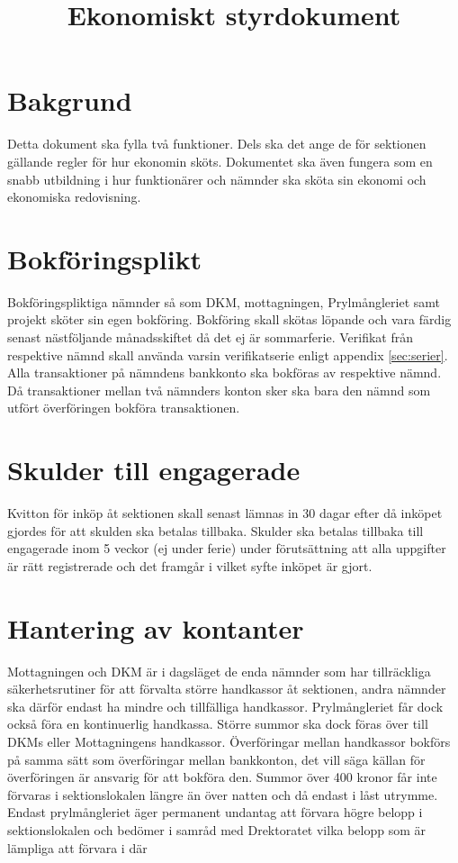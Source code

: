 \documentclass{dgovdoc}
\title{Ekonomiskt styrdokument}
\begin{document}
\maketitle

\section{Bakgrund}

Detta dokument ska fylla två funktioner. Dels ska det ange de för sektionen gällande regler för hur ekonomin
sköts. Dokumentet ska även fungera som en snabb utbildning i hur funktionärer och nämnder ska sköta sin
ekonomi och ekonomiska redovisning.

\section{Bokföringsplikt}

Bokföringspliktiga nämnder så som DKM, mottagningen, Prylmångleriet samt projekt sköter sin egen
bokföring. Bokföring skall skötas löpande och vara färdig senast nästföljande månadsskiftet då det ej är
sommarferie. Verifikat från respektive nämnd skall använda varsin verifikatserie enligt appendix \ref{sec:serier}. Alla
transaktioner på nämndens bankkonto ska bokföras av respektive nämnd. Då transaktioner mellan två
nämnders konton sker ska bara den nämnd som utfört överföringen bokföra transaktionen.

\section{Skulder till engagerade}

Kvitton för inköp åt sektionen skall senast lämnas in 30 dagar efter då inköpet gjordes för att skulden ska
betalas tillbaka. Skulder ska betalas tillbaka till engagerade inom 5 veckor (ej under ferie) under
förutsättning att alla uppgifter är rätt registrerade och det framgår i vilket syfte inköpet är gjort.

\section{Hantering av kontanter}
\label{sec:kontanter}
Mottagningen och DKM är i dagsläget de enda nämnder som har tillräckliga säkerhetsrutiner för att förvalta
större handkassor åt sektionen, andra nämnder ska därför endast ha mindre och tillfälliga handkassor.
Prylmångleriet får dock också föra en kontinuerlig handkassa. Större summor ska dock föras över till DKMs
eller Mottagningens handkassor. Överföringar mellan handkassor bokförs på samma sätt som överföringar
mellan bankkonton, det vill säga källan för överföringen är ansvarig för att bokföra den. Summor över 400
kronor får inte förvaras i sektionslokalen längre än över natten och då endast i låst utrymme. Endast
prylmångleriet äger permanent undantag att förvara högre belopp i sektionslokalen och bedömer i samråd
med D­rektoratet vilka belopp som är lämpliga att förvara i där
\end{document}
